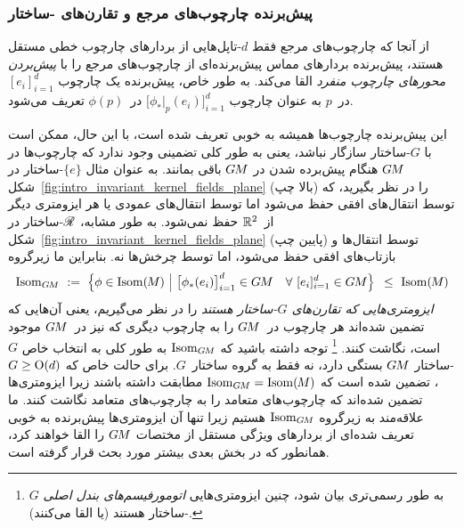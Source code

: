 \subsubsection{پیش‌برنده چارچوب‌های مرجع و تقارن‌های \textit{}-ساختار}

از آنجا که چارچوب‌های مرجع فقط $d$-تاپل‌هایی از بردارهای چارچوب خطی مستقل هستند، پیش‌برنده بردارهای مماس پیش‌برنده‌ای از چارچوب‌های مرجع را با \emph{پیش‌بردن محورهای چارچوب منفرد} القا می‌کند.
به طور خاص، پیش‌برنده یک چارچوب $[e_i]_{i=1}^d$ در~$p$ به عنوان چارچوب $\big[ \phi_*|_p (e_i) \big]_{i=1}^d$ در~$\phi(p)$ تعریف می‌شود.


این پیش‌برنده چارچوب‌ها همیشه به خوبی تعریف شده است، با این حال، ممکن است با $G$-ساختار سازگار نباشد، یعنی به طور کلی تضمینی وجود ندارد که چارچوب‌ها در $G\mkern-1.4muM$ هنگام پیش‌برده شدن در $G\mkern-1.4muM$ باقی بمانند.
به عنوان مثال $\{e\}$-ساختار در شکل~\ref{fig:intro_invariant_kernel_fields_plane} (بالا چپ) را در نظر بگیرید، که توسط انتقال‌های افقی حفظ می‌شود اما توسط انتقال‌های عمودی یا هر ایزومتری دیگر از~$\mathbb{R}^2$ حفظ نمی‌شود.
به طور مشابه، $\mathscr{R}$-ساختار در شکل~\ref{fig:intro_invariant_kernel_fields_plane} (پایین چپ) توسط انتقال‌ها و بازتاب‌های افقی حفظ می‌شود، اما توسط چرخش‌ها نه.
بنابراین ما زیرگروه
\begin{align}\label{eq:IsomGM_def_24}
	\IsomGM\ :=\ \pig\{ \phi \in \IsomM \ \pig|\ 
	\big[\phi_*(e_i)\big]_{i=1}^d \in \GM \quad \forall\ [e_i]_{i=1}^d \in \GM \pig\} \,\ \leq\ \IsomM
\end{align}
\emph{ایزومتری‌هایی که تقارن‌های $G$-ساختار هستند} را در نظر می‌گیریم، یعنی آن‌هایی که تضمین شده‌اند هر چارچوب در~$G\mkern-1.4muM$ را به چارچوب دیگری که نیز در~$G\mkern-1.4muM$ موجود است، نگاشت کنند.%
\footnote{
	به طور رسمی‌تری بیان شود، چنین ایزومتری‌هایی \emph{اتومورفیسم‌های بندل اصلی} $G$-ساختار هستند (یا القا می‌کنند).
}
توجه داشته باشید که $\operatorname{Isom}_{G\mkern-1.4muM}$ به طور کلی به انتخاب خاص $G$-ساختار $G\mkern-1.4muM$ بستگی دارد، نه فقط به گروه ساختار~$G$.
برای حالت خاص که $G\geq\operatorname{O}(d)$، تضمین شده است که $\operatorname{Isom}_{G\mkern-1.4muM}=\operatorname{Isom}(\mkern-1.5mu M \mkern-.5mu)$ مطابقت داشته باشند زیرا ایزومتری‌ها تضمین شده‌اند که چارچوب‌های متعامد را به چارچوب‌های متعامد نگاشت کنند.
ما علاقه‌مند به زیرگروه $\operatorname{Isom}_{G\mkern-1.4muM}$ هستیم زیرا تنها آن ایزومتری‌ها پیش‌برنده به خوبی تعریف شده‌ای از بردارهای ویژگی مستقل از مختصات $G\mkern-1.4muM$ را القا خواهند کرد، همانطور که در بخش بعدی بیشتر مورد بحث قرار گرفته است.


